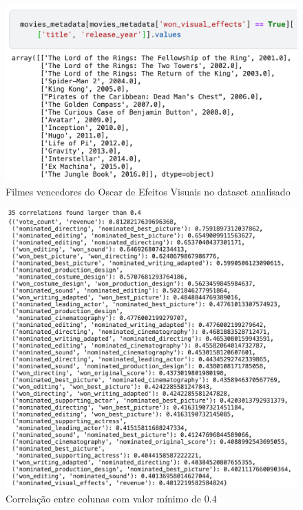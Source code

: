             \begin{figure}[htb]
            	\caption{\label{vencedores_efeitos}Filmes vencedores do Oscar de Efeitos Visuais no dataset analisado}
            	\begin{center}
            		\includegraphics[scale=0.7]{vencedores_efeitos.png}
            	\end{center}
            \end{figure}

            \begin{figure}[htb]
            	\caption{\label{corrs0.4}Correlação entre colunas com valor mínimo de 0.4}
            	\begin{center}
            		\includegraphics[scale=0.7]{corrs0.4.png}
            	\end{center}
            \end{figure}

